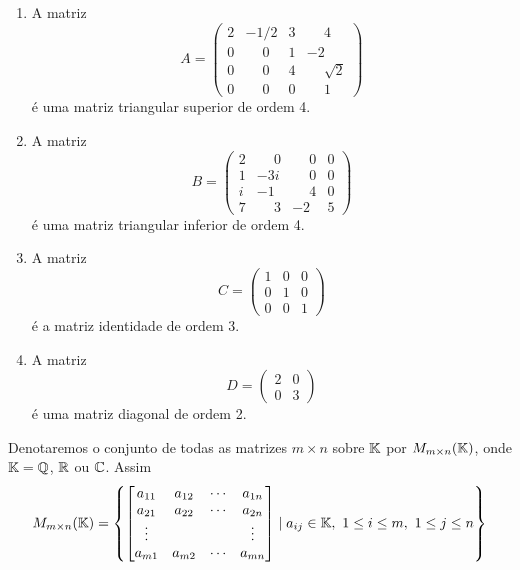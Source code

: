 \begin{exemplos}
    \begin{enumerate}
        \item A matriz
            \[
                A = \begin{pmatrix}
                    2 & -1/2 & 3 & \phantom{-}4\\
                    0 & \phantom{-}0 & 1 & -2\\
                    0 & \phantom{-}0 & 4 & \phantom{-}\sqrt{2}\\
                    0 & \phantom{-}0 & 0 & \phantom{-}1
                \end{pmatrix}
            \]
        é uma matriz triangular superior de ordem 4.
        \item A matriz
            \[
                B = \begin{pmatrix}
                    2 & \phantom{-}0 & \phantom{-}0 & 0\\
                    1 & -3i & \phantom{-}0 & 0\\
                    i & -1 & \phantom{-}4 & 0\\
                    7 & \phantom{-}3 & -2 & 5
                \end{pmatrix}
            \]
        é uma matriz triangular inferior de ordem 4.
        \item A matriz
            \[
                C = \begin{pmatrix}
                    1 & 0 & 0\\
                    0 & 1 & 0\\
                    0 & 0 & 1
                \end{pmatrix}
            \]
        é a matriz identidade de ordem 3.
        \item A matriz
            \[
                D = \begin{pmatrix}
                    2 & 0\\
                    0 & 3
                \end{pmatrix}
            \]
        é uma matriz diagonal de ordem 2.
    \end{enumerate}
\end{exemplos}

\begin{notacao}
	Denotaremos o conjunto de todas as matrizes $m \times n$ sobre $\mathbb{K}$ por $M_{m\times n}(\mathbb{K})$, onde $\mathbb{K} = \mathbb{Q}$, $\mathbb{R}$ ou $\mathbb{C}$. Assim
	\[
		M_{m \times n}(\mathbb{K}) = \left\{\begin{bmatrix}
			a_{11} & a_{12} & \cdots & a_{1n}\\
			a_{21} & a_{22} & \cdots & a_{2n}\\
			\vdots & & & \vdots\\
		a_{m1} & a_{m2} & \cdots & a_{mn}\end{bmatrix} \mid a_{ij} \in \mathbb{K},\ 1 \le i \le m,\ 1 \le j \le n
		\right\}
	\]
\end{notacao}

